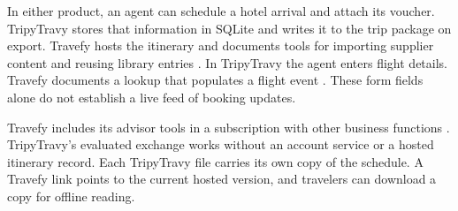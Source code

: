 In either product, an agent can schedule a hotel arrival and attach its voucher. TripyTravy stores that information in SQLite and writes it to the trip package on export. Travefy hosts the itinerary and documents tools for importing supplier content and reusing library entries \cite{travefybuilder}. In TripyTravy the agent enters flight details. Travefy documents a lookup that populates a flight event \cite{travefyflight}. These form fields alone do not establish a live feed of booking updates.

Travefy includes its advisor tools in a subscription with other business functions \cite{travefypricing}. TripyTravy's evaluated exchange works without an account service or a hosted itinerary record. Each TripyTravy file carries its own copy of the schedule. A Travefy link points to the current hosted version, and travelers can download a copy for offline reading.
